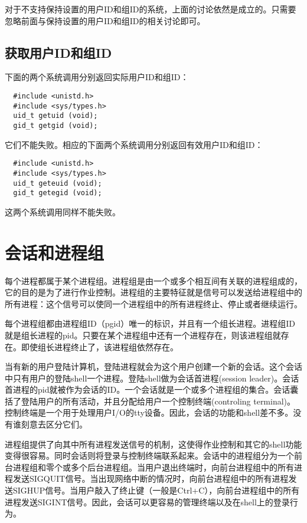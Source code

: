 对于不支持保持设置的用户ID和组ID的系统，上面的讨论依然是成立的。只需要忽略前面与保持设置的用户ID和组ID的相关讨论即可。

\subsection{获取用户ID和组ID}

下面的两个系统调用分别返回实际用户ID和组ID：

\begin{lstlisting}
  #include <unistd.h>
  #include <sys/types.h>
  uid_t getuid (void);
  gid_t getgid (void);
\end{lstlisting}

它们不能失败。相应的下面两个系统调用分别返回有效用户ID和组ID：

\begin{lstlisting}
  #include <unistd.h>
  #include <sys/types.h>
  uid_t geteuid (void);
  gid_t getegid (void);
\end{lstlisting}

这两个系统调用同样不能失败。

\section{会话和进程组}

每个进程都属于某个进程组。进程组是由一个或多个相互间有关联的进程组成的，它的目的是为了进行作业控制。进程组的主要特征就是信号可以发送给进程组中的所有进程：这个信号可以使同一个进程组中的所有进程终止、停止或者继续运行。

每个进程组都由进程组ID（pgid）唯一的标识，并且有一个组长进程。进程组ID就是组长进程的pid。只要在某个进程组中还有一个进程存在，则该进程组就存在。即使组长进程终止了，该进程组依然存在。

当有新的用户登陆计算机，登陆进程就会为这个用户创建一个新的会话。这个会话中只有用户的登陆shell一个进程。登陆shell做为会话首进程(session leader)。会话首进程的pid就被作为会话的ID。一个会话就是一个或多个进程组的集合。会话囊括了登陆用户的所有活动，并且分配给用户一个控制终端(controling terminal)。控制终端是一个用于处理用户I/O的tty设备。因此，会话的功能和shell差不多。没有谁刻意去区分它们。

进程组提供了向其中所有进程发送信号的机制，这使得作业控制和其它的shell功能变得很容易。同时会话则将登录与控制终端联系起来。会话中的进程组分为一个前台进程组和零个或多个后台进程组。当用户退出终端时，向前台进程组中的所有进程发送SIGQUIT信号。当出现网络中断的情况时，向前台进程组中的所有进程发送SIGHUP信号。当用户敲入了终止键（一般是Ctrl+C），向前台进程组中的所有进程发送SIGINT信号。因此，会话可以更容易的管理终端以及在shell上的登录行为。

